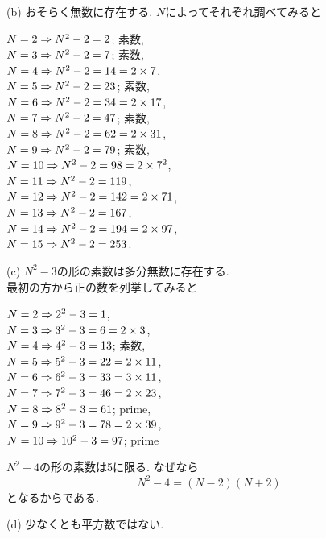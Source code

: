 \documentclass{jarticle}
\begin{document}
(b) おそらく無数に存在する. %
$N$によってそれぞれ調べてみると

\noindent $N = 2 \Rightarrow N^2 - 2 = 2$; 素数, \\
\noindent $N = 3 \Rightarrow N^2 - 2 = 7$; 素数, \\
\noindent $N = 4 \Rightarrow N^2 - 2 = 14 = 2 \times 7$, \\
\noindent $N = 5 \Rightarrow N^2 - 2 = 23$; 素数, \\
\noindent $N = 6 \Rightarrow N^2 - 2 = 34 = 2 \times 17$, \\
\noindent $N = 7 \Rightarrow N^2 - 2 = 47$; 素数,\\
\noindent $N = 8 \Rightarrow N^2 - 2 = 62 = 2 \times 31$, \\
\noindent $N = 9 \Rightarrow N^2 - 2 = 79$; 素数, \\
\noindent $N = 10 \Rightarrow N^2 - 2 = 98 = 2 \times 7^2$, \\
\noindent $N = 11 \Rightarrow N^2 - 2 = 119$, \\
\noindent $N = 12 \Rightarrow N^2 - 2 = 142 = 2 \times 71$, \\
\noindent $N = 13 \Rightarrow N^2 - 2 = 167$, \\
\noindent $N = 14 \Rightarrow N^2 - 2 = 194 = 2 \times 97$, \\
\noindent $N = 15 \Rightarrow N^2 - 2 = 253$. %

(c) $N^2 - 3$の形の素数は多分無数に存在する. \\ %
最初の方から正の数を列挙してみると

$N = 2 \Rightarrow 2^2 - 3 = 1$, \\
$N = 3 \Rightarrow 3^2 - 3 = 6 = 2 \times 3$, \\
$N = 4 \Rightarrow 4^2 - 3 = 13$; 素数, \\
$N = 5 \Rightarrow 5^2 - 3 = 22 = 2 \times 11$, \\
$N = 6 \Rightarrow 6^2 - 3 = 33 = 3 \times 11$, \\
$N = 7 \Rightarrow 7^2 - 3 = 46 = 2 \times 23$, \\
$N = 8 \Rightarrow 8^2 - 3 = 61$; prime, \\
$N = 9 \Rightarrow 9^2 - 3 = 78 = 2 \times 39$, \\
$N = 10 \Rightarrow 10^2 - 3 = 97$; prime

$N^2 - 4$の形の素数は5に限る.
なぜなら
\[
  N^2 - 4 = (N-2)(N+2)
\]
となるからである. %

(d) 少なくとも平方数ではない.

\end{document}
